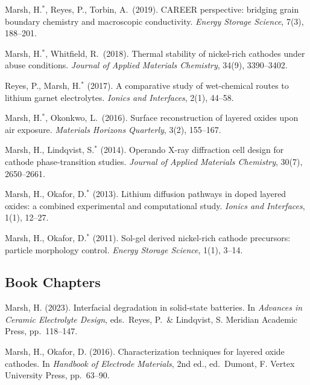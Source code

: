 \documentclass[11pt,a4paper]{moderncv}
\begin{document}
\begin{enumerate}[leftmargin=*,itemsep=3pt,topsep=6pt,label={[J\arabic*]}]
\item Marsh, H.\(^{*}\), Reyes, P., Torbin, A.\dag\ (2019). CAREER perspective: bridging grain boundary chemistry and macroscopic conductivity. \textit{Energy Storage Science}, 7(3), 188--201.
\item Marsh, H.\(^{*}\), Whitfield, R.\dag\ (2018). Thermal stability of nickel-rich cathodes under abuse conditions. \textit{Journal of Applied Materials Chemistry}, 34(9), 3390--3402.
\item Reyes, P., Marsh, H.\(^{*}\) (2017). A comparative study of wet-chemical routes to lithium garnet electrolytes. \textit{Ionics and Interfaces}, 2(1), 44--58.
\item Marsh, H.\(^{*}\), Okonkwo, L.\dag\ (2016). Surface reconstruction of layered oxides upon air exposure. \textit{Materials Horizons Quarterly}, 3(2), 155--167.
\item Marsh, H., Lindqvist, S.\(^{*}\) (2014). Operando X-ray diffraction cell design for cathode phase-transition studies. \textit{Journal of Applied Materials Chemistry}, 30(7), 2650--2661.
\item Marsh, H., Okafor, D.\(^{*}\) (2013). Lithium diffusion pathways in doped layered oxides: a combined experimental and computational study. \textit{Ionics and Interfaces}, 1(1), 12--27.
\item Marsh, H., Okafor, D.\(^{*}\) (2011). Sol-gel derived nickel-rich cathode precursors: particle morphology control. \textit{Energy Storage Science}, 1(1), 3--14.
\end{enumerate}

\subsection{Book Chapters}
\begin{enumerate}[leftmargin=*,itemsep=3pt,topsep=6pt,label={[B\arabic*]}]
\item Marsh, H. (2023). Interfacial degradation in solid-state batteries. In \textit{Advances in Ceramic Electrolyte Design}, eds.\ Reyes, P.\ \& Lindqvist, S. Meridian Academic Press, pp.\ 118--147.
\item Marsh, H., Okafor, D. (2016). Characterization techniques for layered oxide cathodes. In \textit{Handbook of Electrode Materials}, 2nd ed., ed.\ Dumont, F. Vertex University Press, pp.\ 63--90.
\end{enumerate}
\end{document}

